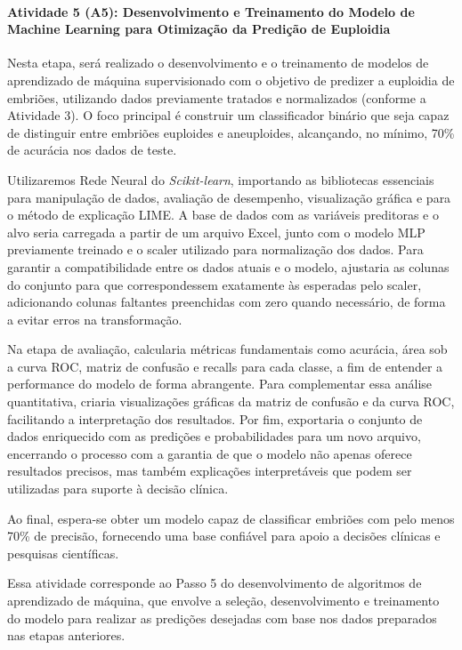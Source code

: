 \paragraph{\textbf{Atividade 5 (A5):} Desenvolvimento e Treinamento do Modelo de Machine Learning para Otimização da Predição de Euploidia}

Nesta etapa, será realizado o desenvolvimento e o treinamento de modelos de aprendizado de máquina supervisionado com o objetivo de predizer a euploidia de embriões, utilizando dados previamente tratados e normalizados (conforme a Atividade 3). O foco principal é construir um classificador binário que seja capaz de distinguir entre embriões euploides e aneuploides, alcançando, no mínimo, 70\% de acurácia nos dados de teste. 

Utilizaremos Rede Neural do \textit{Scikit-learn}, importando as bibliotecas essenciais para manipulação de dados, avaliação de desempenho, visualização gráfica e para o método de explicação LIME. A base de dados com as variáveis preditoras e o alvo seria carregada a partir de um arquivo Excel, junto com o modelo MLP previamente treinado e o scaler utilizado para normalização dos dados. Para garantir a compatibilidade entre os dados atuais e o modelo, ajustaria as colunas do conjunto para que correspondessem exatamente às esperadas pelo scaler, adicionando colunas faltantes preenchidas com zero quando necessário, de forma a evitar erros na transformação.

Na etapa de avaliação, calcularia métricas fundamentais como acurácia, área sob a curva ROC, matriz de confusão e recalls para cada classe, a fim de entender a performance do modelo de forma abrangente. Para complementar essa análise quantitativa, criaria visualizações gráficas da matriz de confusão e da curva ROC, facilitando a interpretação dos resultados. Por fim, exportaria o conjunto de dados enriquecido com as predições e probabilidades para um novo arquivo, encerrando o processo com a garantia de que o modelo não apenas oferece resultados precisos, mas também explicações interpretáveis que podem ser utilizadas para suporte à decisão clínica.

Ao final, espera-se obter um modelo capaz de classificar embriões com pelo menos 70\% de precisão, fornecendo uma base confiável para apoio a decisões clínicas e pesquisas científicas.

Essa atividade corresponde ao Passo 5 do desenvolvimento de algoritmos de aprendizado de máquina, que envolve a seleção, desenvolvimento e treinamento do modelo para realizar as predições desejadas com base nos dados preparados nas etapas anteriores.

